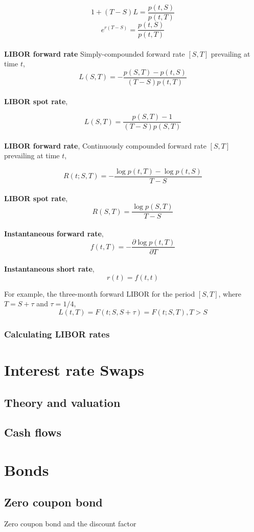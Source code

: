 \documentclass[11pt,a4paper]{article}
\numberwithin{equation}{section}
\begin{document}

\[ 
1+(T-S)L=\frac{p(t,S)}{p(t,T)}
\]
\[ 
e^{r(T-S)}=\frac{p(t,S)}{p(t,T)}
\]
\\
\textbf{LIBOR forward rate}
Simply-compounded forward rate $[S,T]$ prevailing at time $t$,
\[
L(S,T) = -\frac{p(S,T)-p(t,S)}{(T-S)p(t,T)}
\]
\\
\textbf{LIBOR spot rate},

\[
L(S,T)=\frac{p(S,T)-1}{(T-S)p(S,T)}
\]
\\
\textbf{LIBOR forward rate},
Continuously compounded forward rate $[S,T]$ prevailing at time $t$,

\[
R(t;S,T)=-\frac{\log{p(t,T)}-\log{p(t,S)}}{T-S}
\]
\\
\textbf{LIBOR spot rate},
\[
R(S,T)=\frac{\log{p(S,T)}}{T-S}
\]
\\
\textbf{Instantaneous forward rate},
\[
f(t,T)=-\frac{\partial\log{p(t,T)}}{\partial{T}}
\]
\\
\textbf{Instantaneous short rate},
\[
r(t)=f(t,t)
\]

For example, the three-month forward LIBOR for the period $[S,T]$, where $T=S+\tau$ and $\tau=1/4$,
\[
L(t,T) = F(t;S,S+\tau) = F(t;S,T), T>S
\]

\subsubsection{Calculating LIBOR rates}

\section{Interest rate Swaps}
\subsection{Theory and valuation}
\subsection{Cash flows}
\section{Bonds}
\label{sec:fi}

\subsection{Zero coupon bond}
Zero coupon bond and the discount factor
\end{document}

